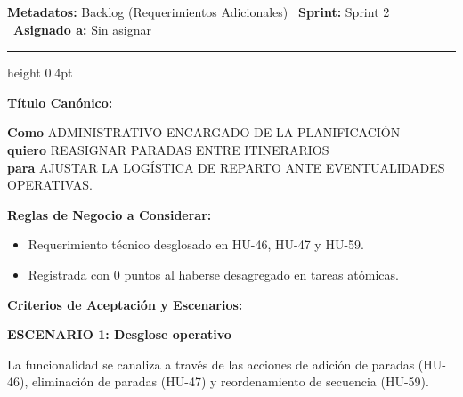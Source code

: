 \documentclass[a4paper,9pt]{article}
\begin{document}
\begin{tcolorbox}[hucard, title={\textbf{HU-157: REASIGNAR PARADAS (DESARMAR HU EN VARIAS)} \hfill \scriptsize \colorbox{bluestatus}{\textbf{\ New\ }} \quad \colorbox{white}{\textcolor{primarydark}{\textbf{\ 0 pts\ }}}}]
\vspace{-1pt}
\noindent\textbf{\footnotesize Metadatos:} Backlog (Requerimientos Adicionales) \textbar\ \textbf{Sprint:} Sprint 2 \textbar\ \textbf{Asignado a:} Sin asignar\par\vspace{2pt}
\hrule height 0.4pt\par\vspace{3pt}
\noindent\textbf{\footnotesize Título Canónico:}\par\vspace{1pt}
{\small \textbf{Como} ADMINISTRATIVO ENCARGADO DE LA PLANIFICACIÓN \\ \textbf{quiero} REASIGNAR PARADAS ENTRE ITINERARIOS \\ \textbf{para} AJUSTAR LA LOGÍSTICA DE REPARTO ANTE EVENTUALIDADES OPERATIVAS.}\par\vspace{3pt}
\noindent\textbf{\footnotesize Reglas de Negocio a Considerar:}\par\vspace{1pt}
{\footnotesize
\begin{itemize}[leftmargin=12pt, nosep, itemsep=1.5pt, topsep=1pt]
\item Requerimiento técnico desglosado en HU-46, HU-47 y HU-59.
\item Registrada con 0 puntos al haberse desagregado en tareas atómicas.
\end{itemize}
}\par\vspace{3pt}
\noindent\textbf{\footnotesize Criterios de Aceptación y Escenarios:}\par\vspace{2pt}
{\footnotesize
\noindent\textbf{\textcolor{secondarydark}{ESCENARIO 1:  Desglose operativo}}\par\vspace{1pt}
La funcionalidad se canaliza a través de las acciones de adición de paradas (HU-46), eliminación de paradas (HU-47) y reordenamiento de secuencia (HU-59).\par\vspace{2.5pt}
}\par
\end{tcolorbox}
\end{document}
